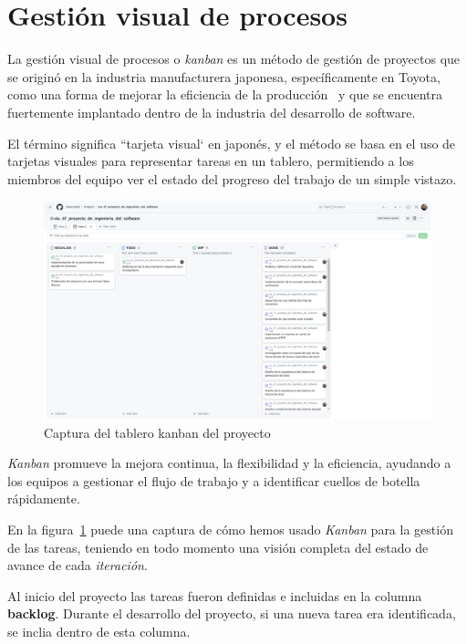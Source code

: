 \section{Gestión visual de procesos}

La gestión visual de procesos o \textit{kanban} es un método de gestión de proyectos que se originó en la industria
manufacturera japonesa, específicamente en Toyota, como una forma de mejorar la eficiencia de la
producción~\cite{book_anderson_2010} y que se encuentra fuertemente implantado dentro de la industria del desarrollo
de software.

El término significa ``tarjeta visual` en japonés, y el método se basa en el uso de tarjetas visuales para
representar tareas en un tablero, permitiendo a los miembros del equipo ver el estado del progreso del trabajo de un
simple vistazo.

\begin{figure}[ht]
    \begin{center}
        \includegraphics[width=\textwidth]{./chapter/3/images/chapter_3.kanban}
        \caption{Captura del tablero kanban del proyecto}
        \label{fig:chapter_3.kanban}
    \end{center}
\end{figure}

\textit{Kanban} promueve la mejora continua, la flexibilidad y la eficiencia, ayudando a los equipos a gestionar el
flujo de trabajo y a identificar cuellos de botella rápidamente.

En la figura~\ref{fig:chapter_3.kanban} puede una captura de cómo hemos usado \textit{Kanban} para la gestión de las
tareas, teniendo en todo momento una visión completa del estado de avance de cada \textit{iteración}.

Al inicio del proyecto las tareas fueron definidas e incluidas en la columna \textbf{backlog}.
Durante el desarrollo del proyecto, si una nueva tarea era identificada, se inclia dentro de esta columna.

